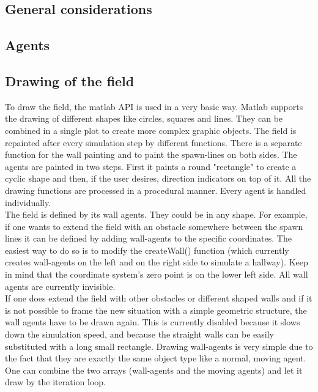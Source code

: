 
\subsection{General considerations}


\subsection{Agents}


\subsection{Drawing of the field}\label{drawField}
To draw the field, the matlab API is used in a very basic way. Matlab supports the drawing of different shapes like circles, squares and lines. They can be combined in a single plot to create more complex graphic objects. The field is repainted after every simulation step by different functions. There is a separate function for the wall painting and to paint the spawn-lines on both sides. The agents are painted in two steps. First it paints a round "rectangle" to create a cyclic shape and then, if the user desires, direction indicators on top of it. All the drawing functions are processed in a procedural manner. Every agent is handled individually.\\

The field is defined by its wall agents. They could be in any shape. For example, if one wants to extend the field with an obstacle somewhere between the spawn lines it can be defined by adding wall-agents to the specific coordinates. The easiest way to do so is to modify the createWall() function (which currently creates wall-agents on the left and on the right side to simulate a hallway). Keep in mind that the coordinate system's zero point is on the lower left side. All wall agents are currently invisible.\\

If one does extend the field with other obstacles or different shaped walls and if it is not possible to frame the new situation with a simple geometric structure, the wall agents have to be drawn again. This is currently disabled because it slows down the simulation speed, and because the straight walls can be easily substituted with a long small rectangle. Drawing wall-agents is very simple due to the fact that they are exactly the same object type like a normal, moving agent. One can combine the two arrays (wall-agents and the moving agents) and let it draw by the iteration loop.\\

